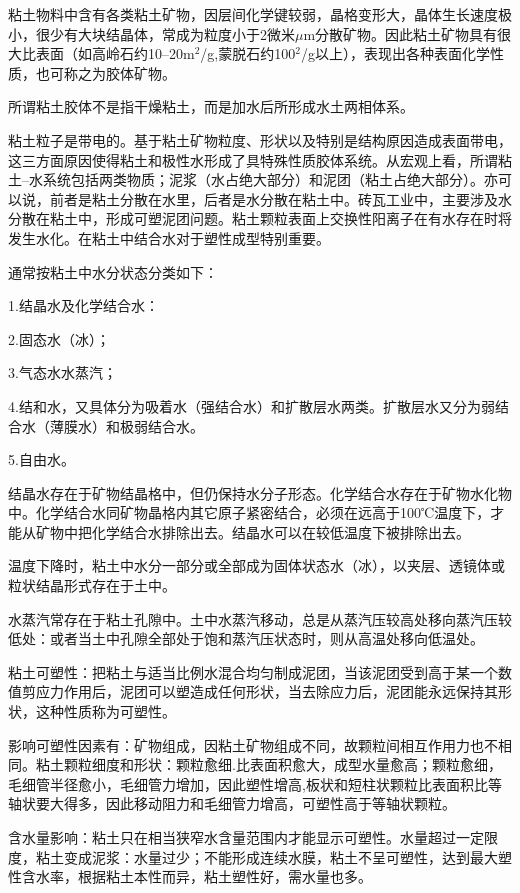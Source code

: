 \documentclass{ctexbook}
\begin{document}
粘土物料中含有各类粘土矿物，因层间化学键较弱，晶格变形大，晶体生长速度极小，很少有大块结晶体，常成为粒度小于2微米$\mu$m分散矿物。因此粘土矿物具有很大比表面（如高岭石约10--20m$^2$/g,蒙脱石约100$^2$/g以上），表现出各种表面化学性质，也可称之为胶体矿物。

所谓粘土胶体不是指干燥粘土，而是加水后所形成水土两相体系。

粘土粒子是带电的。基于粘土矿物粒度、形状以及特别是结构原因造成表面带电，这三方面原因使得粘土和极性水形成了具特殊性质胶体系统。从宏观上看，所谓粘土--水系统包括两类物质；泥浆（水占绝大部分）和泥团（粘土占绝大部分）。亦可以说，前者是粘土分散在水里，后者是水分散在粘土中。砖瓦工业中，主要涉及水分散在粘土中，形成可塑泥团问题。粘土颗粒表面上交换性阳离子在有水存在时将发生水化。在粘土中结合水对于塑性成型特别重要。

通常按粘土中水分状态分类如下：

1.结晶水及化学结合水：

2.固态水（冰）；

3.气态水水蒸汽；

4.结和水，又具体分为吸着水（强结合水）和扩散层水两类。扩散层水又分为弱结合水（薄膜水）和极弱结合水。

5.自由水。

结晶水存在于矿物结晶格中，但仍保持水分子形态。化学结合水存在于矿物水化物中。化学结合水同矿物晶格内其它原子紧密结合，必须在远高于100℃温度下，才能从矿物中把化学结合水排除出去。结晶水可以在较低温度下被排除出去。

温度下降时，粘土中水分一部分或全部成为固体状态水（冰），以夹层、透镜体或粒状结晶形式存在于土中。

水蒸汽常存在于粘土孔隙中。土中水蒸汽移动，总是从蒸汽压较高处移向蒸汽压较低处：或者当土中孔隙全部处于饱和蒸汽压状态时，则从高温处移向低温处。

粘土可塑性：把粘土与适当比例水混合均匀制成泥团，当该泥团受到高于某一个数值剪应力作用后，泥团可以塑造成任何形状，当去除应力后，泥团能永远保持其形状，这种性质称为可塑性。

影响可塑性因素有：矿物组成，因粘土矿物组成不同，故颗粒间相互作用力也不相同。粘土颗粒细度和形状：颗粒愈细.比表面积愈大，成型水量愈高；颗粒愈细，毛细管半径愈小，毛细管力增加，因此塑性增高,板状和短柱状颗粒比表面积比等轴状要大得多，因此移动阻力和毛细管力增高，可塑性高于等轴状颗粒。

含水量影响：粘土只在相当狭窄水含量范围内才能显示可塑性。水量超过一定限度，粘土变成泥浆：水量过少；不能形成连续水膜，粘土不呈可塑性，达到最大塑性含水率，根据粘土本性而异，粘土塑性好，需水量也多。
\end{document}
